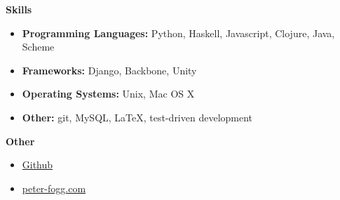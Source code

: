 \documentclass[letterpaper,11pt]{article}
\newcommand{\resheading}[1]{{\large\colorbox{mygrey}{\begin{minipage}{\textwidth}{\textbf{#1\vphantom{p\^{E}}}}\end{minipage}}}}
\begin{document}
\resheading{Skills}
\begin{itemize}
\item
  \textbf{Programming Languages:} Python, Haskell, Javascript, Clojure, Java, Scheme
\item
  \textbf{Frameworks:} Django, Backbone, Unity
\item
  \textbf{Operating Systems:} Unix, Mac OS X
\item
  \textbf{Other:} git, MySQL,  \LaTeX, test-driven development
\end{itemize}

\resheading{Other}
\begin{itemize}
\item \href{https://github.com/peter-fogg}{Github}
\item \href{http://peter-fogg.com}{peter-fogg.com}
\end{itemize}
\end{document}
